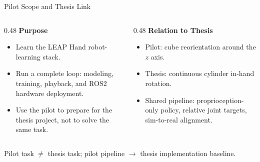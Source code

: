\documentclass{beamer}
\begin{document}
\begin{frame}{Pilot Scope and Thesis Link}
    \small
    \begin{columns}[T,onlytextwidth]
        \begin{column}{0.48\textwidth}
            \textbf{\textcolor{maincolor}{Purpose}}
            \begin{itemize}
                \item Learn the LEAP Hand robot-learning stack.
                \item Run a complete loop: modeling, training, playback, and ROS2 hardware deployment.
                \item Use the pilot to prepare for the thesis project, not to solve the same task.
            \end{itemize}
        \end{column}
        \begin{column}{0.48\textwidth}
            \textbf{\textcolor{maincolor}{Relation to Thesis}}
            \begin{itemize}
                \item Pilot: cube reorientation around the $z$ axis.
                \item Thesis: continuous cylinder in-hand rotation.
                \item Shared pipeline: proprioception-only policy, relative joint targets, sim-to-real alignment.
            \end{itemize}
        \end{column}
    \end{columns}

    \vspace{0.4em}
    \centering
    \textcolor{maincolor}{Pilot task $\neq$ thesis task; pilot pipeline $\rightarrow$ thesis implementation baseline.}
\end{frame}
\end{document}
